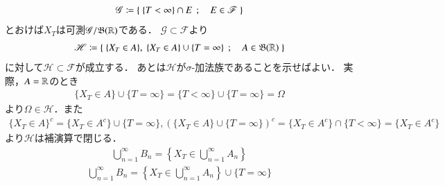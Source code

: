 \begin{prf}
	\begin{align}
		\mathscr{G} \coloneqq \left\{\ \{T < \infty\} \cap E\ \, ; \quad E \in \mathscr{F}\ \right\}
	\end{align}
	とおけば$X_T$は可測$\mathscr{G}/\mathfrak{B}(\mathbb{R})$である．
	$\mathscr{G} \subset \mathscr{F}$より
	\begin{align}
		\mathscr{H} \coloneqq \left\{\ \{X_T \in A\},\ \{X_T \in A\} \cup \{T = \infty\}\ \, ; \quad A \in \mathfrak{B}(\mathbb{R})\ \right\}
	\end{align}
	に対して$\mathscr{H} \subset \mathscr{F}$が成立する．
	あとは$\mathscr{H}$が$\sigma$-加法族であることを示せばよい．
	実際，$A = \mathbb{R}$のとき
	\begin{align}
		\{X_T \in A\} \cup \{T = \infty\} = \{T < \infty\} \cup \{T = \infty\} = \Omega
	\end{align}
	より$\Omega \in \mathcal{H}$．また
	\begin{align}
		\{X_T \in A\}^c = \{X_T \in A^c\} \cup \{T = \infty\},
		\left( \{X_T \in A\} \cup \{T = \infty\} \right)^c
		=  \{X_T \in A^c\} \cap \{T < \infty\}
		= \{X_T \in A^c\}
	\end{align}
	より$\mathscr{H}$は補演算で閉じる．
	\begin{align}
		\bigcup_{n=1}^{\infty} B_n = \left\{X_T \in \bigcup_{n=1}^{\infty} A_n \right\}
	\end{align}
	\begin{align}
		\bigcup_{n=1}^{\infty} B_n = \left\{X_T \in \bigcup_{n=1}^{\infty} A_n \right\} \cup \{T = \infty\}
	\end{align}
\end{prf}